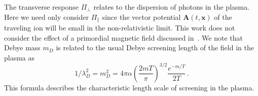 The transverse response $\Pi_{\perp}$ relates to the dispersion of photons in the plasma. Here we need only consider $\Pi_\parallel$ since the vector potential $\boldsymbol{A}(t,\boldsymbol{x})$ of the traveling ion will be small in the non-relativistic limit. This work does not consider the effect of a primordial magnetic field discussed in~\cite{Steinmetz:2023abc}. We note that Debye mass $m_D$ is related to the usual Debye screening length of the field in the plasma as
\begin{equation}\label{eq:mL}
	1/\lambda_D^{2} = m_D^2= 4 \pi \alpha \left(\frac{2mT}{\pi}\right)^{3/2}\frac{e^{-m/T}}{2T}\,.
\end{equation}
This formula describes the characteristic length scale of screening in the plasma.

